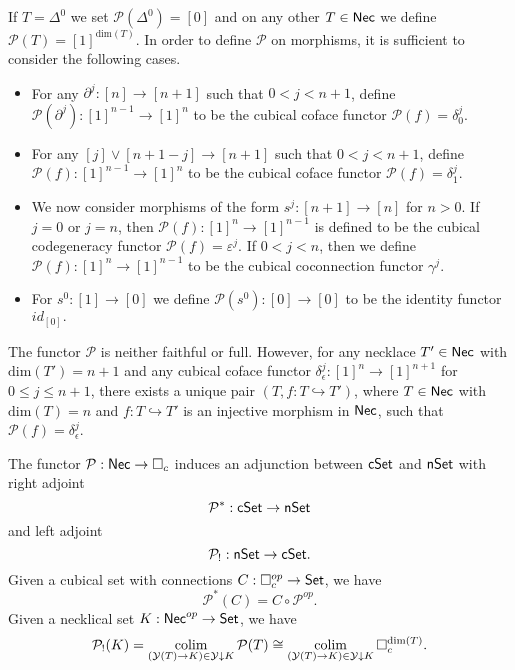 If $T= \Delta^0$ we set $\mathcal{P}(\Delta^0)=[0]$ and on any other $T \in \mathsf{Nec}$ we define $\mathcal{P}( T )= [1]^{\text{dim}(T)}$. In order to define $\mathcal{P}$ on morphisms, it is sufficient to consider the following cases.
\begin{itemize}
\item For any $\partial^j: [n] \to [n+1]$ such that $0< j<{n+1}$, define $\mathcal{P}(\partial^j): [1]^{n-1}\to [1]^{n}$ to be the cubical coface functor $\mathcal{P}(f)= \delta_0^{j}.$ 

\item For any $[j] \vee [n+1-j] \to [n+1]$ such that $0<j<n+1$, define $\mathcal{P}(f): [1]^{n-1}\to [1]^{n}$ to be the cubical coface functor $\mathcal{P}(f)=\delta_1^{j}$.

\item We now consider morphisms of the form $s^j: [n+1] \to [n]$ for $n>0$. If $j=0$ or $j=n$, then $\mathcal{P}(f): [1]^n \to [1]^{n-1}$ is defined to be the cubical codegeneracy functor $\mathcal{P}(f)= \varepsilon^{j}.$ If $0<j<n$, then we define $\mathcal{P}(f): [1]^n \to [1]^{n-1}$ to be the cubical coconnection functor $\gamma^{j}.$

\item For $s^0: [1] \to [0]$ we define $\mathcal{P}(s^0): [0] \to [0]$ to be the identity functor $id_{[0]}.$

\end{itemize}
\begin{remark}
The functor $\mathcal{P}$ is neither faithful or full. However, for any necklace $T' \in \mathsf{Nec}$ with $\text{dim}(T')=n+1$ and any cubical coface functor $\delta_{\epsilon}^j: [1]^n \to [1]^{n+1}$ for $0 \leq j \leq n+1$, there exists a unique pair $(T, f: T \hookrightarrow T')$, where $T \in \mathsf{Nec}$ with $\text{dim}(T)=n$ and $f: T \hookrightarrow T'$ is an injective morphism in $\mathsf{Nec}$, such that $\mathcal{P}(f)=\delta_{\epsilon}^j $.
\end{remark}

The functor $\mathcal{P}: \mathsf{Nec} \to \square_c$ induces an adjunction between $\mathsf{cSet}$ and $\mathsf{nSet}$
with right adjoint
$$\mathcal{P}^*: \mathsf{cSet} \to \mathsf{nSet}$$
and left adjoint
$$\mathcal{P}_{!} : \mathsf{nSet} \to \mathsf{cSet}.$$
Given a cubical set with connections $C: \square_c^{op} \to \mathsf{Set}$, we have $$\mathcal{P}^*(C)= C \circ \mathcal{P}^{op}.$$ Given a necklical set $K: \mathsf{Nec}^{op} \to \mathsf{Set}$, we have $$\mathcal{P}_{!}(K)= \operatorname*{colim}_{(\mathcal{Y}(T) \to K) \in \mathcal{Y} \downarrow K} \mathcal{P}(T) \cong \operatorname*{colim}_{(\mathcal{Y}(T) \to K) \in \mathcal{Y} \downarrow K} \square_c^{\text{dim}(T)}.$$



